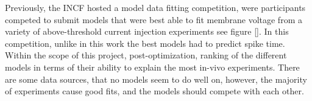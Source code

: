 Previously, the INCF hosted a model data fitting competition, were participants competed to submit models that were best able to fit membrane voltage from a variety of above-threshold current injection experiments see figure \ref{}. In this competition, unlike in this work the best models had to predict spike time. Within the scope of this project, post-optimization, ranking of the different models in terms of their ability to explain the most in-vivo experiments.  There are some data sources, that no models seem to do well on, however, the majority of experiments cause good fits, and the models should compete with each other.